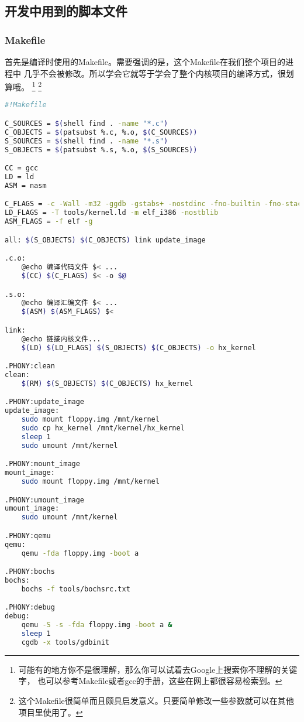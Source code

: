 \subsection{开发中用到的脚本文件}

\subsubsection{Makefile}
\par 首先是编译时使用的Makefile。需要强调的是，这个Makefile在我们整个项目的进程中\allowbreak
几乎不会被修改。所以学会它就等于学会了整个内核项目的编译方式，很划算哦。
\footnote{可能有的地方你不是很理解，那么你可以试着去Google上搜索你不理解的关键字，\allowbreak
也可以参考Makefile或者gcc的手册，这些在网上都很容易检索到。}
\footnote{这个Makefile很简单而且颇具启发意义。只要简单修改一些参数就可以在其他项目里使用了。}

\begin{lstlisting}[language = sh, caption = Makefile]
#!Makefile

C_SOURCES = $(shell find . -name "*.c")
C_OBJECTS = $(patsubst %.c, %.o, $(C_SOURCES))
S_SOURCES = $(shell find . -name "*.s")
S_OBJECTS = $(patsubst %.s, %.o, $(S_SOURCES))

CC = gcc
LD = ld
ASM = nasm

C_FLAGS = -c -Wall -m32 -ggdb -gstabs+ -nostdinc -fno-builtin -fno-stack-protector -I include
LD_FLAGS = -T tools/kernel.ld -m elf_i386 -nostblib
ASM_FLAGS = -f elf -g

all: $(S_OBJECTS) $(C_OBJECTS) link update_image

.c.o:
	@echo 编译代码文件 $< ...
	$(CC) $(C_FLAGS) $< -o $@

.s.o:
	@echo 编译汇编文件 $< ...
	$(ASM) $(ASM_FLAGS) $<

link:
	@echo 链接内核文件...
	$(LD) $(LD_FLAGS) $(S_OBJECTS) $(C_OBJECTS) -o hx_kernel

.PHONY:clean
clean:
	$(RM) $(S_OBJECTS) $(C_OBJECTS) hx_kernel

.PHONY:update_image
update_image:
	sudo mount floppy.img /mnt/kernel
	sudo cp hx_kernel /mnt/kernel/hx_kernel
	sleep 1
	sudo umount /mnt/kernel

.PHONY:mount_image
mount_image:
	sudo mount floppy.img /mnt/kernel

.PHONY:umount_image
umount_image:
	sudo umount /mnt/kernel

.PHONY:qemu
qemu:
	qemu -fda floppy.img -boot a

.PHONY:bochs
bochs:
	bochs -f tools/bochsrc.txt

.PHONY:debug
debug:
	qemu -S -s -fda floppy.img -boot a &
	sleep 1
	cgdb -x tools/gdbinit

\end{lstlisting} 

